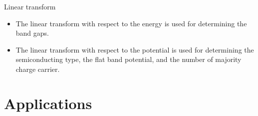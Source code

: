 \documentclass[10pt,compress]{beamer}
\begin{document}
    \begin{frame}[allowframebreaks=1.0]{Linear transform}
        \begin{itemize}
            \item The linear transform with respect to the energy is used for determining the band gaps. 
            \item The linear transform with respect to the potential  is used for determining 
                  the semiconducting type, the flat band potential, 
                  and the number of majority charge carrier.
        \end{itemize}
    \end{frame}



\section{Applications}
\end{document}
